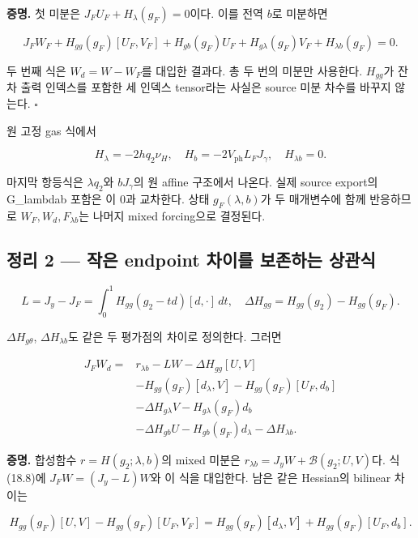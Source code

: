 \textbf{증명.} 첫 미분은 \(J_FU_F+H_\lambda(g_F)=0\)이다. 이를 전역
\(b\)로 미분하면

\[
J_FW_F+H_{gg}(g_F)[U_F,V_F]
+H_{gb}(g_F)U_F+H_{g\lambda}(g_F)V_F
+H_{\lambda b}(g_F)=0.
\]

두 번째 식은 \(W_d=W-W_F\)를 대입한 결과다. 총 두 번의 미분만 사용한다.
\(H_{gg}\)가 잔차 출력 인덱스를 포함한 세 인덱스 tensor라는 사실은
source 미분 차수를 바꾸지 않는다. \(\square\)

원 고정 gas 식에서

\[
H_\lambda=-2hq_2\nu_H,\quad
H_b=-2V_{\mathrm{ph}}L_FJ_\gamma,\quad
\boxed{H_{\lambda b}=0}.
\tag{18.9}
\]

마지막 항등식은 \(\lambda q_2\)와 \(bJ_\gamma\)의 원 affine 구조에서
나온다. 실제 source export의 G\_lambdab 포함은 이 0과 교차한다. 상태
\(g_F(\lambda,b)\)가 두 매개변수에 함께 반응하므로
\(W_F,W_d,F_{\lambda b}\)는 나머지 mixed forcing으로 결정된다.

\hypertarget{uxc815uxb9ac-2-uxc791uxc740-endpoint-uxcc28uxc774uxb97c-uxbcf4uxc874uxd558uxb294-uxc0c1uxad00uxc2dd}{%
\subsection{정리 2 --- 작은 endpoint 차이를 보존하는
상관식}\label{uxc815uxb9ac-2-uxc791uxc740-endpoint-uxcc28uxc774uxb97c-uxbcf4uxc874uxd558uxb294-uxc0c1uxad00uxc2dd}}

\[
L=J_y-J_F=\int_0^1 H_{gg}(g_2-td)[d,\cdot]\,dt,
\quad
\Delta H_{gg}=H_{gg}(g_2)-H_{gg}(g_F).
\tag{18.10}
\]

\(\Delta H_{g\theta}\), \(\Delta H_{\lambda b}\)도 같은 두 평가점의
차이로 정의한다. 그러면

\[
\boxed{\begin{aligned}
J_FW_d={}&r_{\lambda b}-LW-\Delta H_{gg}[U,V]\\
&-H_{gg}(g_F)[d_\lambda,V]
-H_{gg}(g_F)[U_F,d_b]\\
&-\Delta H_{g\lambda}V-H_{g\lambda}(g_F)d_b\\
&-\Delta H_{gb}U-H_{gb}(g_F)d_\lambda
-\Delta H_{\lambda b}.
\end{aligned}}
\tag{18.11}
\]

\textbf{증명.} 합성함수 \(r=H(g_2;\lambda,b)\)의 mixed 미분은
\(r_{\lambda b}=J_yW+\mathcal B(g_2;U,V)\)다. 식 (18.8)에
\(J_FW=(J_y-L)W\)와 이 식을 대입한다. 남은 같은 Hessian의 bilinear
차이는

\[
H_{gg}(g_F)[U,V]-H_{gg}(g_F)[U_F,V_F]
=H_{gg}(g_F)[d_\lambda,V]+H_{gg}(g_F)[U_F,d_b].
\tag{18.12}
\]

